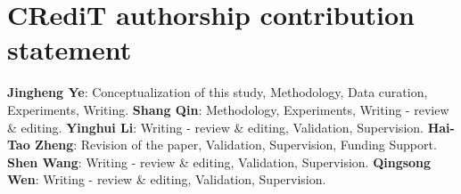 \section*{CRediT authorship contribution statement}
\label{sec:CRediT}
\textbf{Jingheng Ye}: Conceptualization of this study, Methodology, Data curation, Experiments, Writing.
\textbf{Shang Qin}: Methodology, Experiments, Writing - review \& editing.
\textbf{Yinghui Li}: Writing - review \& editing, Validation, Supervision. 
\textbf{Hai-Tao Zheng}: Revision of the paper, Validation, Supervision, Funding Support. 
\textbf{Shen Wang}: Writing - review \& editing, Validation, Supervision.
\textbf{Qingsong Wen}: Writing - review \& editing, Validation, Supervision.



